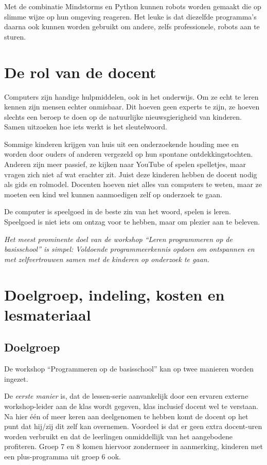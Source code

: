 \documentclass[a4paper,11pt]{article}
\begin{document}
Met de combinatie Mindstorms en Python kunnen robots worden gemaakt die op slimme wijze op hun omgeving reageren.
Het leuke is dat diezelfde programma's daarna ook kunnen worden gebruikt om andere, zelfs professionele, robots aan te sturen.

\section*{De rol van de docent}

Computers zijn handige hulpmiddelen, ook in het onderwijs.
Om ze echt te leren kennen zijn mensen echter onmisbaar.
Dit hoeven geen experts te zijn, ze hoeven slechts een beroep te doen op de natuurlijke nieuwsgierigheid van kinderen.
Samen uitzoeken hoe iets werkt is het sleutelwoord.

Sommige kinderen krijgen van huis uit een onderzoekende houding mee en worden door ouders of anderen vergezeld op hun spontane ontdekkingstochten.
Anderen zijn meer passief, ze kijken naar YouTube of spelen spelletjes, maar vragen zich niet af wat erachter zit.
Juist deze kinderen hebben de docent nodig als gids en rolmodel.
Docenten hoeven niet alles van computers te weten, maar ze moeten een kind wel kunnen aanmoedigen zelf op onderzoek te gaan.

De computer is speelgoed in de beste zin van het woord, spelen is leren.
Speelgoed is niet iets om ontzag voor te hebben, maar om plezier aan te beleven.

\emph{Het meest prominente doel van de workshop ``Leren programmeren op de basisschool'' is simpel:
Voldoende programmeerkennis opdoen om ontspannen en met zelfvertrouwen samen met de kinderen op onderzoek te gaan.}

\section*{Doelgroep, indeling, kosten en lesmateriaal}

\subsection*{Doelgroep}

De workshop ``Programmeren op de basisschool'' kan op twee manieren worden ingezet.

De \emph{eerste manier} is, dat de lessen-serie aanvankelijk door een ervaren externe workshop-leider aan de klas wordt gegeven, klas inclusief docent wel te verstaan.
Na hier één of meer keren aan deelgenomen te hebben komt de docent op het punt dat hij/zij dit zelf kan overnemen.
Voordeel is dat er geen extra docent-uren worden verbruikt en dat de leerlingen onmiddellijk van het aangebodene profiteren.
Groep 7 en 8 komen hiervoor zondermeer in aanmerking, kinderen met een plus-programma uit groep 6 ook.
\end{document}
